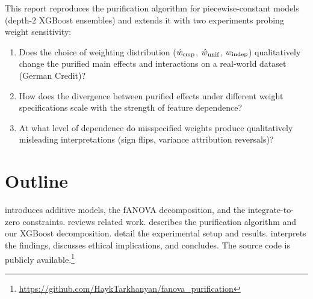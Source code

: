 This report reproduces the purification algorithm for piecewise-constant models (depth-2 XGBoost ensembles) and extends it with two experiments probing weight sensitivity:

\begin{enumerate}
    \item[\textbf{RQ1}] Does the choice of weighting distribution ($\hat{w}_{\mathrm{emp}}$, $\hat{w}_{\mathrm{unif}}$, $w_{\mathrm{indep}}$) qualitatively change the purified main effects and interactions on a real-world dataset (German Credit)?
    \item[\textbf{RQ2}] How does the divergence between purified effects under different weight specifications scale with the strength of feature dependence?
    \item[\textbf{RQ3}] At what level of dependence do misspecified weights produce qualitatively misleading interpretations (sign flips, variance attribution reversals)?
\end{enumerate}

\section{Outline}

 introduces additive models, the \gls{fANOVA} decomposition, and the integrate-to-zero constraints.
 reviews related work.
 describes the purification algorithm and our XGBoost decomposition.
 detail the experimental setup and results.
 interprets the findings, discusses ethical implications, and concludes.
The source code is publicly available.\footnote{\url{https://github.com/HaykTarkhanyan/fanova_purification}}
